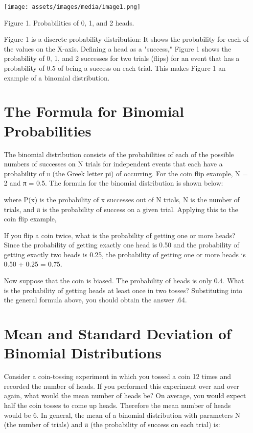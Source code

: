 \documentclass{book}
\begin{document}
\texttt{[image: assets/images/media/image1.png]}

Figure 1. Probabilities of 0, 1, and 2 heads.

Figure 1 is a discrete probability distribution: It shows the probability for
each of the values on the X-axis. Defining a head as a "success," Figure 1
shows the probability of 0, 1, and 2 successes for two trials (flips) for an
event that has a probability of 0.5 of being a success on each trial. This
makes Figure 1 an example of a binomial distribution.

\hypertarget{the-formula-for-binomial-probabilities}{%
\section{The Formula for Binomial
Probabilities}\label{the-formula-for-binomial-probabilities}}

The binomial distribution consists of the probabilities of each of the
possible numbers of successes on N trials for independent events that each
have a probability of π (the Greek letter pi) of occurring. For the coin flip
example, N = 2 and π = 0.5. The formula for the binomial distribution is shown
below:

where P(x) is the probability of x successes out of N trials, N is the number
of trials, and π is the probability of success on a given trial. Applying this
to the coin flip example,

If you flip a coin twice, what is the probability of getting one or more
heads? Since the probability of getting exactly one head is 0.50 and the
probability of getting exactly two heads is 0.25, the probability of getting
one or more heads is 0.50 + 0.25 = 0.75.

Now suppose that the coin is biased. The probability of heads is only 0.4.
What is the probability of getting heads at least once in two tosses?
Substituting into the general formula above, you should obtain the answer .64.

\hypertarget{mean-and-standard-deviation-of-binomial-distributions}{%
\section{Mean and Standard Deviation of Binomial
Distributions}\label{mean-and-standard-deviation-of-binomial-distributions}}

Consider a coin-tossing experiment in which you tossed a coin 12 times and
recorded the number of heads. If you performed this experiment over and over
again, what would the mean number of heads be? On average, you would expect
half the coin tosses to come up heads. Therefore the mean number of heads
would be 6. In general, the mean of a binomial distribution with parameters N
(the number of trials) and π (the probability of success on each trial) is:
\end{document}
